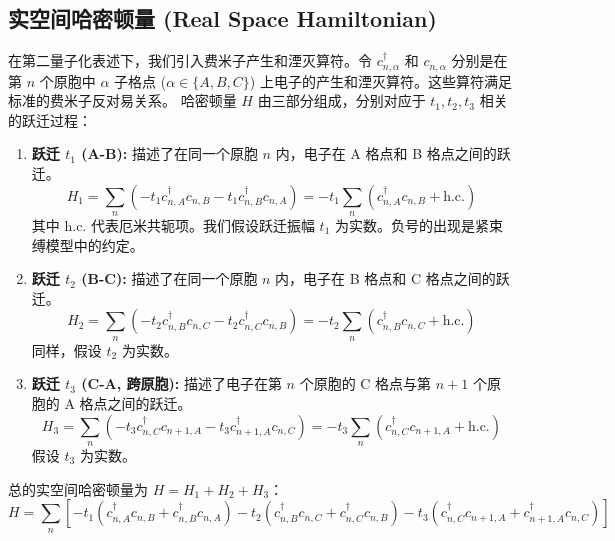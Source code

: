 \documentclass[UTF-8]{ctexart}
\begin{document}
\subsection{实空间哈密顿量 (Real Space Hamiltonian)}
在第二量子化表述下，我们引入费米子产生和湮灭算符。令 $c_{n,\alpha}^\dagger$ 和 $c_{n,\alpha}$ 分别是在第 $n$ 个原胞中 $\alpha$ 子格点 ($\alpha \in \{A, B, C\}$) 上电子的产生和湮灭算符。这些算符满足标准的费米子反对易关系。
哈密顿量 $H$ 由三部分组成，分别对应于 $t_1, t_2, t_3$ 相关的跃迁过程：
\begin{enumerate}
    \item \textbf{跃迁 $t_1$ (A-B):} 描述了在同一个原胞 $n$ 内，电子在 A 格点和 B 格点之间的跃迁。
    \[ H_1 = \sum_n \left( -t_1 c_{n,A}^\dagger c_{n,B} -t_1 c_{n,B}^\dagger c_{n,A} \right) = -t_1 \sum_n (c_{n,A}^\dagger c_{n,B} + \text{h.c.}) \]
    其中 h.c. 代表厄米共轭项。我们假设跃迁振幅 $t_1$ 为实数。负号的出现是紧束缚模型中的约定。
    \item \textbf{跃迁 $t_2$ (B-C):} 描述了在同一个原胞 $n$ 内，电子在 B 格点和 C 格点之间的跃迁。
    \[ H_2 = \sum_n \left( -t_2 c_{n,B}^\dagger c_{n,C} -t_2 c_{n,C}^\dagger c_{n,B} \right) = -t_2 \sum_n (c_{n,B}^\dagger c_{n,C} + \text{h.c.}) \]
    同样，假设 $t_2$ 为实数。
    \item \textbf{跃迁 $t_3$ (C-A, 跨原胞):} 描述了电子在第 $n$ 个原胞的 C 格点与第 $n+1$ 个原胞的 A 格点之间的跃迁。
    \[ H_3 = \sum_n \left( -t_3 c_{n,C}^\dagger c_{n+1,A} -t_3 c_{n+1,A}^\dagger c_{n,C} \right) = -t_3 \sum_n (c_{n,C}^\dagger c_{n+1,A} + \text{h.c.}) \]
    假设 $t_3$ 为实数。
\end{enumerate}
总的实空间哈密顿量为 $H = H_1 + H_2 + H_3$：
\[
H = \sum_n \left[ -t_1 (c_{n,A}^\dagger c_{n,B} + c_{n,B}^\dagger c_{n,A}) -t_2 (c_{n,B}^\dagger c_{n,C} + c_{n,C}^\dagger c_{n,B}) -t_3 (c_{n,C}^\dagger c_{n+1,A} + c_{n+1,A}^\dagger c_{n,C}) \right]
\]
\end{document}
